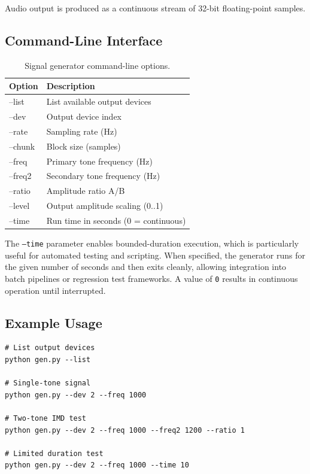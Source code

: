 \documentclass[conference]{IEEEtran}
\begin{document}
Audio output is produced as a continuous stream of 32-bit floating-point samples.

\subsection{Command-Line Interface}
\begin{table}[t]
\centering
\caption{Signal generator command-line options.}
\label{tab:gen_cli}
\begin{tabular}{>{\ttfamily}p{2.6cm} p{4.8cm}}
\toprule
Option & Description \\
\midrule
--list & List available output devices \\
--dev & Output device index \\
--rate & Sampling rate (Hz) \\
--chunk & Block size (samples) \\
--freq & Primary tone frequency (Hz) \\
--freq2 & Secondary tone frequency (Hz) \\
--ratio & Amplitude ratio A/B \\
--level & Output amplitude scaling (0..1) \\
--time & Run time in seconds (0 = continuous) \\
\bottomrule
\end{tabular}
\end{table}

The \texttt{--time} parameter enables bounded-duration execution, which is particularly useful for automated testing and scripting. When specified, the generator runs for the given number of seconds and then exits cleanly, allowing integration into batch pipelines or regression test frameworks. A value of \texttt{0} results in continuous operation until interrupted.

\subsection{Example Usage}
\begin{lstlisting}[style=shellstyle]
# List output devices
python gen.py --list

# Single-tone signal
python gen.py --dev 2 --freq 1000

# Two-tone IMD test
python gen.py --dev 2 --freq 1000 --freq2 1200 --ratio 1

# Limited duration test
python gen.py --dev 2 --freq 1000 --time 10
\end{lstlisting}
\end{document}
